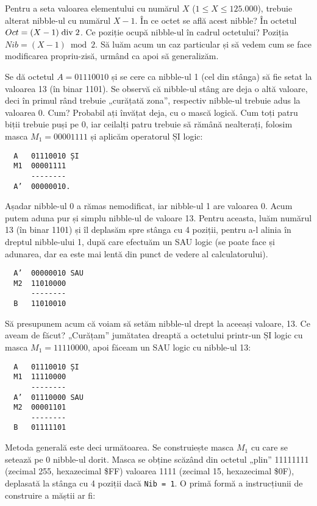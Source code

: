 Pentru a seta valoarea elementului cu numărul $X$ ($1 \leq X \leq 125.000$),
trebuie alterat nibble-ul cu numărul $X-1$. În ce octet se află acest nibble?
În octetul $Oct = (X-1) \bdiv 2$. Ce poziție ocupă nibble-ul în cadrul
octetului? Poziția $Nib = (X-1) \bmod 2$. Să luăm acum un caz particular și să
vedem cum se face modificarea propriu-zisă, urmând ca apoi să generalizăm.

Se dă octetul $A = 01110010$ și se cere ca nibble-ul 1 (cel din stânga) să fie
setat la valoarea 13 (în binar 1101). Se observă că nibble-ul stâng are deja o
altă valoare, deci în primul rând trebuie „curățată zona”, respectiv nibble-ul
trebuie adus la valoarea 0. Cum? Probabil ați învățat deja, cu o mască
logică. Cum toți patru biții trebuie puși pe 0, iar ceilalți patru trebuie să
rămână nealterați, folosim masca $M_1 = 00001111$ și aplicăm operatorul ȘI
logic:

\begin{verbatim}
  A   01110010 ȘI
  M1  00001111
      --------
  A’  00000010.
\end{verbatim}

Așadar nibble-ul 0 a rămas nemodificat, iar nibble-ul 1 are valoarea 0. Acum
putem aduna pur și simplu nibble-ul de valoare 13. Pentru aceasta, luăm
numărul 13 (în binar 1101) și îl deplasăm spre stânga cu 4 poziții, pentru a-l
alinia în dreptul nibble-ului 1, după care efectuăm un SAU logic (se poate
face și adunarea, dar ea este mai lentă din punct de vedere al
calculatorului).

\begin{verbatim}
  A’  00000010 SAU
  M2  11010000
      --------
  B   11010010
\end{verbatim}

Să presupunem acum că voiam să setăm nibble-ul drept la aceeași valoare,
13. Ce aveam de făcut? „Curățam” jumătatea dreaptă a octetului printr-un ȘI
logic cu masca $M_1 = 11110000$, apoi făceam un SAU logic cu nibble-ul 13:

\begin{verbatim}
  A   01110010 ȘI
  M1  11110000
      --------
  A’  01110000 SAU
  M2  00001101
      --------
  B   01111101
\end{verbatim}

Metoda generală este deci următoarea. Se construiește masca $M_1$ cu care se
setează pe 0 nibble-ul dorit. Masca se obține scăzând din octetul „plin”
11111111 (zecimal 255, hexazecimal \$FF) valoarea 1111 (zecimal 15,
hexazecimal \$0F), deplasată la stânga cu 4 poziții dacă {\tt Nib = 1}. O
primă formă a instrucțiunii de construire a măștii ar fi:

